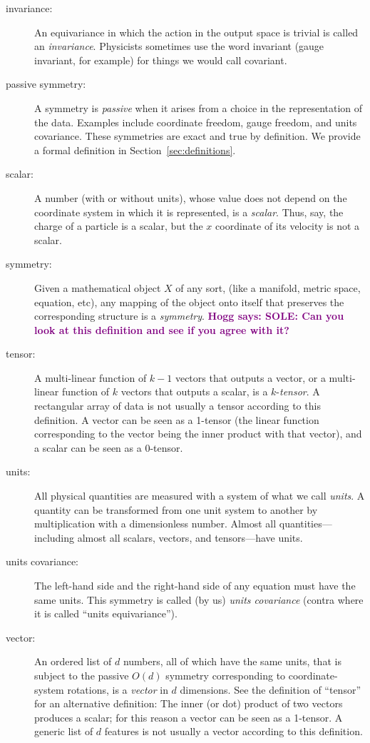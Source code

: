 \documentclass[preprint]{article} %
\newcommand{\sectionname}{Section}
\newcommand{\secref}[1]{\sectionname~\ref{#1}}
\newcommand{\hogg}[1]{\textcolor{purple}{\textbf{Hogg says: #1}}}
\begin{document}
\begin{description}
\item[invariance:]
  An equivariance in which the action in the output space is trivial is called an \emph{invariance}.
  Physicists sometimes use the word invariant (gauge invariant, for example) for things we would call covariant.
\item[passive symmetry:]
  A symmetry is \emph{passive} when it arises from a choice in the representation of the data. 
  Examples include coordinate freedom, gauge freedom, and units covariance.
  These symmetries are exact and true by definition.
  We provide a formal definition in \secref{sec:definitions}.
\item[scalar:]
  A number (with or without units), whose value does not depend on the coordinate system in which it is represented, is a \emph{scalar}.
  Thus, say, the charge of a particle is a scalar, but the $x$ coordinate of its velocity is not a scalar.
\item[symmetry:]
  Given a mathematical object $X$ of any sort, (like a manifold, metric space, equation, etc), any mapping of the object onto itself that preserves the corresponding structure is a \emph{symmetry}.
  \hogg{SOLE: Can you look at this definition and see if you agree with it?}
\item[tensor:]
  A multi-linear function of $k-1$ vectors that outputs a vector, or a multi-linear function of $k$ vectors that outputs a scalar, is a $k$-\emph{tensor}.
  A rectangular array of data is not usually a tensor according to this definition.
  A vector can be seen as a 1-tensor (the linear function corresponding to the vector being the inner product with that vector), and a scalar can be seen as a 0-tensor.
\item[units:]
  All physical quantities are measured with a system of what we call \emph{units}.
  A quantity can be transformed from one unit system to another by multiplication with a dimensionless number.
  Almost all quantities---including almost all scalars, vectors, and tensors---have units.
\item[units covariance:]
  The left-hand side and the right-hand side of any equation must have the same units.
  This symmetry is called (by us) \emph{units covariance} (contra \citealt{villar2022dimensionless} where it is called ``units equivariance'').
\item[vector:]
  An ordered list of $d$ numbers, all of which have the same units, that is subject to the passive $O(d)$ symmetry corresponding to coordinate-system rotations, is a \emph{vector} in $d$ dimensions.
  See the definition of ``tensor'' for an alternative definition:
  The inner (or dot) product of two vectors produces a scalar; for this reason a vector can be seen as a 1-tensor.
  A generic list of $d$ features is not usually a vector according to this definition.
\end{description}
\end{document}
